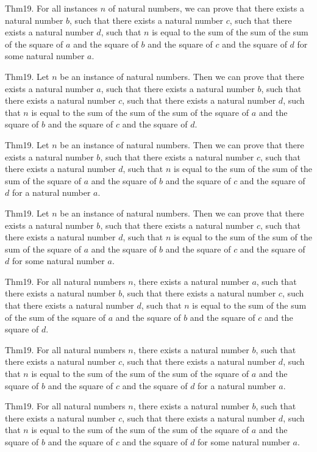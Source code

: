 \documentclass{article}
\begin{document}
Thm19. For all instances $n$ of natural numbers, we can prove that there exists a natural number $b$, such that there exists a natural number $c$, such that there exists a natural number $d$, such that $n$ is equal to the sum of the sum of the sum of the square of $a$ and the square of $b$ and the square of $c$ and the square of $d$ for some natural number $a$.

Thm19. Let $n$ be an instance of natural numbers. Then we can prove that there exists a natural number $a$, such that there exists a natural number $b$, such that there exists a natural number $c$, such that there exists a natural number $d$, such that $n$ is equal to the sum of the sum of the sum of the square of $a$ and the square of $b$ and the square of $c$ and the square of $d$.

Thm19. Let $n$ be an instance of natural numbers. Then we can prove that there exists a natural number $b$, such that there exists a natural number $c$, such that there exists a natural number $d$, such that $n$ is equal to the sum of the sum of the sum of the square of $a$ and the square of $b$ and the square of $c$ and the square of $d$ for a natural number $a$.

Thm19. Let $n$ be an instance of natural numbers. Then we can prove that there exists a natural number $b$, such that there exists a natural number $c$, such that there exists a natural number $d$, such that $n$ is equal to the sum of the sum of the sum of the square of $a$ and the square of $b$ and the square of $c$ and the square of $d$ for some natural number $a$.

Thm19. For all natural numbers $n$, there exists a natural number $a$, such that there exists a natural number $b$, such that there exists a natural number $c$, such that there exists a natural number $d$, such that $n$ is equal to the sum of the sum of the sum of the square of $a$ and the square of $b$ and the square of $c$ and the square of $d$.

Thm19. For all natural numbers $n$, there exists a natural number $b$, such that there exists a natural number $c$, such that there exists a natural number $d$, such that $n$ is equal to the sum of the sum of the sum of the square of $a$ and the square of $b$ and the square of $c$ and the square of $d$ for a natural number $a$.

Thm19. For all natural numbers $n$, there exists a natural number $b$, such that there exists a natural number $c$, such that there exists a natural number $d$, such that $n$ is equal to the sum of the sum of the sum of the square of $a$ and the square of $b$ and the square of $c$ and the square of $d$ for some natural number $a$.
\end{document}
